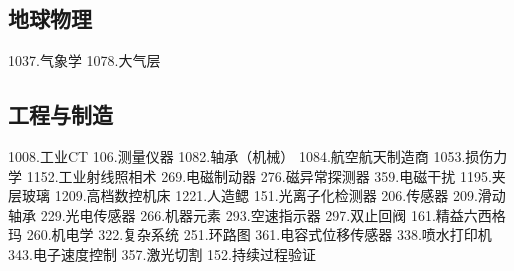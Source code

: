 \subsection{地球物理}
1037.气象学
1078.大气层

\subsection{工程与制造}
1008.工业CT
106.测量仪器
1082.轴承（机械）
1084.航空航天制造商
1053.损伤力学
1152.工业射线照相术
269.电磁制动器
276.磁异常探测器
359.电磁干扰
1195.夹层玻璃
1209.高档数控机床
1221.人造鳃
151.光离子化检测器
206.传感器
209.滑动轴承
229.光电传感器
266.机器元素
293.空速指示器
297.双止回阀
161.精益六西格玛
260.机电学
322.复杂系统
251.环路图
361.电容式位移传感器
338.喷水打印机
343.电子速度控制
357.激光切割
152.持续过程验证
